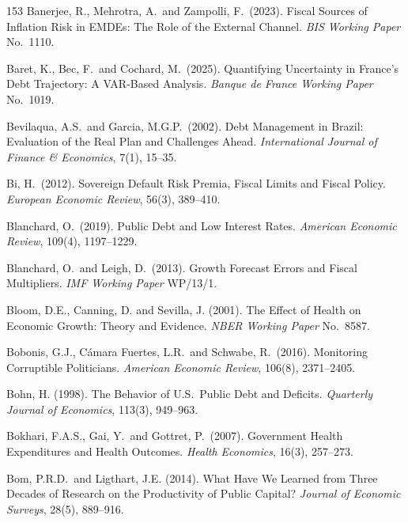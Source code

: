 \documentclass[11pt,a4paper]{article}
\begin{document}
\begin{thebibliography}{153}
 Banerjee, R., Mehrotra, A.\ and Zampolli, F.\ (2023). Fiscal Sources of Inflation Risk in EMDEs: The Role of the External Channel. \textit{BIS Working Paper} No.\ 1110.

 Baret, K., Bec, F.\ and Cochard, M.\ (2025). Quantifying Uncertainty in France's Debt Trajectory: A VAR-Based Analysis. \textit{Banque de France Working Paper} No.\ 1019.

 Bevilaqua, A.S.\ and Garcia, M.G.P.\ (2002). Debt Management in Brazil: Evaluation of the Real Plan and Challenges Ahead. \textit{International Journal of Finance \& Economics}, 7(1), 15--35.

 Bi, H.\ (2012). Sovereign Default Risk Premia, Fiscal Limits and Fiscal Policy. \textit{European Economic Review}, 56(3), 389--410.

 Blanchard, O.\ (2019). Public Debt and Low Interest Rates. \textit{American Economic Review}, 109(4), 1197--1229.

 Blanchard, O.\ and Leigh, D.\ (2013). Growth Forecast Errors and Fiscal Multipliers. \textit{IMF Working Paper} WP/13/1.

 Bloom, D.E., Canning, D. and Sevilla, J. (2001). The Effect of Health on Economic Growth: Theory and Evidence. \textit{NBER Working Paper} No.\ 8587.

 Bobonis, G.J., C\'amara Fuertes, L.R.\ and Schwabe, R.\ (2016). Monitoring Corruptible Politicians. \textit{American Economic Review}, 106(8), 2371--2405.

 Bohn, H. (1998). The Behavior of U.S.\ Public Debt and Deficits. \textit{Quarterly Journal of Economics}, 113(3), 949--963.

 Bokhari, F.A.S., Gai, Y.\ and Gottret, P.\ (2007). Government Health Expenditures and Health Outcomes. \textit{Health Economics}, 16(3), 257--273.

 Bom, P.R.D.\ and Ligthart, J.E. (2014). What Have We Learned from Three Decades of Research on the Productivity of Public Capital? \textit{Journal of Economic Surveys}, 28(5), 889--916.


\end{thebibliography}
\end{document}
